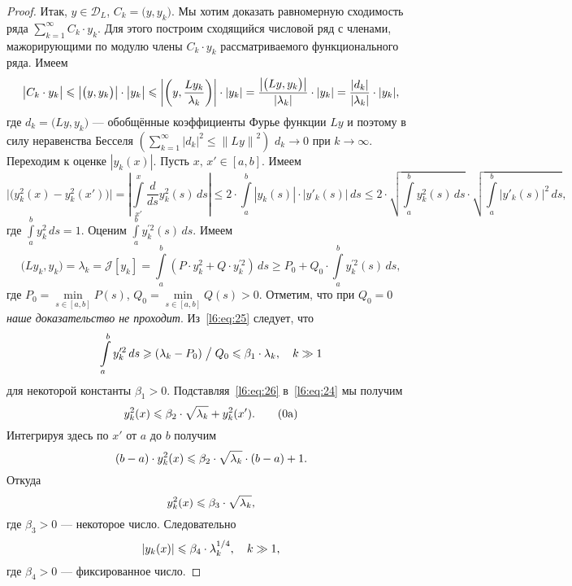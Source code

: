 \documentclass[12pt,a4paper,openany,fleqn]{book}
\newcommand{\J}{\ensuremath{\mathcal{J}}}
\newcommand{\mc}[1]{\ensuremath{\mathcal{#1}}}
\newcommand{\der}[2]{\ensuremath{\frac{d#1}{d#2}}}
\newcommand{\norm}[1]{\ensuremath{\left\|#1\right\|}}
\theoremstyle{definition}
\begin{document}
\begin{proof}
		Итак, $y\in\mc{D}_L$, $C_k=\big(y,y_k\big)$. Мы хотим доказать равномерную сходимость ряда $\sum\limits_{k=1}^{\infty}C_k\cdot y_k$. Для этого построим сходящийся числовой ряд	с членами, мажорирующими по модулю члены $C_k\cdot y_k$ рассматриваемого функционального ряда. Имеем
		\begin{equation}
			\label{l6:eq:23}
			\hfill\big|C_k\cdot y_k\big|\leqslant\big|\big(y,y_k\big)\big|\cdot\big|y_k\big|\leqslant\left|\left(y,\frac{Ly_k}{\lambda_k}\right)\right|\cdot|y_k|=\frac{\big|\big(Ly,y_k\big)\big|}{|\lambda_k|}\cdot|y_k|=\frac{|d_k|}{|\lambda_k|}\cdot|y_k|,\hfill
		\end{equation}
		где $d_k=\big(Ly,y_k\big)$ --- обобщённые коэффициенты Фурье функции $Ly$ и поэтому в силу неравенства Бесселя $\left(\scriptstyle\sum\limits_{k=1}^{\infty}\textstyle|d_k|^2\leqslant{\norm{Ly}}^2\right)$ $d_k\to0$ при $k\to \infty$. Переходим к оценке $|y_k(x)|$. Пусть $x,\,x'\in[a,b]$. Имеем
		\begin{equation}
			\label{l6:eq:24}
			\big|\big(y_k^2(x)-y_k^2(x')\big)\big|=\left|\int\limits_{x'}^{x}\der{}{s}y_k^2(s)\,ds\right|\leqslant2\cdot\int\limits_a^b|y_k(s)|\cdot|y'_k(s)|\,ds\leqslant2\cdot\sqrt{\int\limits_a^b y_k^2(s)\,ds}\cdot\sqrt{\int\limits_a^b |y'_k(s)|^2\,ds},
		\end{equation} 
	где $\int\limits_a^b y_k^2\,ds=1$. Оценим $\int\limits_a^b y_k^{\prime2}(s)\,ds$. Имеем 
	\begin{equation}
		\label{l6:eq:25}
		\big(Ly_k,y_k\big)=\lambda_k=\J[y_k]=\int\limits_a^b\left(P\cdot y_k^2+Q\cdot y_k^{\prime2}\right)\,ds\geqslant P_0+Q_0\cdot\int\limits_a^b y_k^{\prime2}(s)\,ds,
	\end{equation}
	где $P_0=\min\limits_{s\in[a,b]}P(s)$, $Q_0=\min\limits_{s\in[a,b]}Q(s)>0$. Отметим, что при \emph{$Q_0=0$ наше доказательство не проходит}. Из~\eqref{l6:eq:25} следует, что 
	\begin{equation}
		\label{l6:eq:26}
		\hfill\int\limits_a^b y_k^{\prime2}\,ds\geqslant(\lambda_k-P_0)\bigm/Q_0\leqslant\beta_1\cdot\lambda_k,\quad k\gg1\hfill
	\end{equation}  
	для некоторой константы $\beta_1>0$. Подставляя~\eqref{l6:eq:26} в~\eqref{l6:eq:24} мы получим 
	\begin{equation}
		\label{l6:eq:26a}
		\hfill y_k^2(x)\leqslant\beta_2\cdot\sqrt{\lambda_k}+y_k^2(x').\tag{\theequation a}\hfill
	\end{equation}
	Интегрируя здесь по $x'$ от $a$ до $b$ получим 
	\begin{equation*}
		\hfill(b-a)\cdot y_k^2(x)\leqslant\beta_2\cdot\sqrt{\lambda_k}\cdot(b-a)+1.\hfill
	\end{equation*}
	Откуда 
	\begin{equation*}
		\hfill y_k^2(x)\leqslant\beta_3\cdot\sqrt{\lambda_k},\hfill
	\end{equation*}
	где $\beta_3>0$ --- некоторое число. Следовательно
	\begin{equation}
		\label{l6:eq:27}
		\hfill|y_k(x)|\leqslant\beta_4\cdot\lambda_k^{1/4},\quad k\gg1,\hfill
	\end{equation}
	где $\beta_4>0$ --- фиксированное число.
	

\end{proof}
\end{document}
